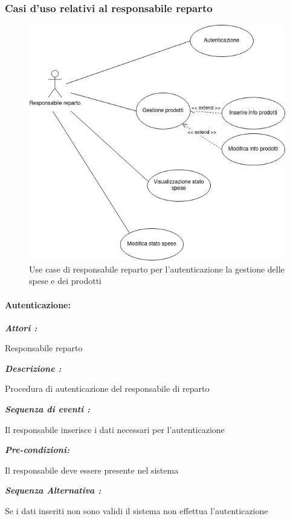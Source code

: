 \documentclass{article}
\begin{document}
\subsubsection{Casi d'uso relativi al responsabile reparto}

\begin{figure}[h!]
	\centering
	\includegraphics[width=\textwidth]{UseCaseResponsabile.jpg}
	\caption{Use case di responsabile reparto per l'autenticazione la gestione delle spese e dei prodotti}
	\label{fig:UseCaseResponsabile}
\end{figure}

\paragraph{Autenticazione:}
\begin{mdframed}

	\noindent\textit{\textbf{Attori :}}


	Responsabile reparto

	\noindent\textit{\textbf{Descrizione :}}


	Procedura di autenticazione del responsabile di reparto

	\noindent\textit{\textbf{Sequenza di eventi :}}


	Il responsabile inserisce i dati necessari per l'autenticazione

	\noindent\textit{\textbf{Pre-condizioni:}}


	Il responsabile deve essere presente nel sistema

	\noindent\textit{\textbf{Sequenza Alternativa :}}


	Se i dati inseriti non sono validi il sistema non effettua
	l'autenticazione

\end{mdframed}
\end{document}

